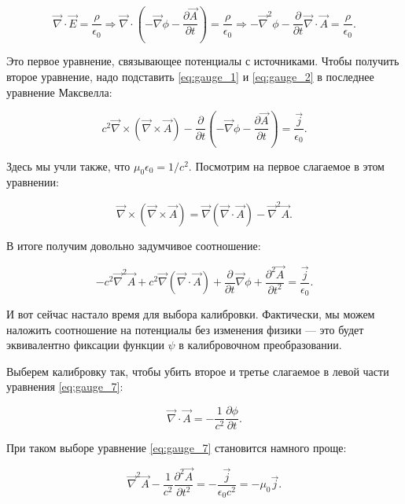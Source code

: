 \documentclass[12pt,a4paper]{article}
\numberwithin{equation}{section}
\numberwithin{equation}{section}
\newcommand{\pt}{\partial}
\newcommand{\vn}{\vec{\nabla}}
\newcommand{\eps}{\epsilon}
\begin{document}
\begin{equation}
  \label{eq:gauge_4}
  \vn \cdot \vec{E} = \frac{\rho}{\eps_0} \Rightarrow \vn \cdot \left(
   -\vn \phi - \frac{\pt \vec{A}}{\pt t} \right) =
 \frac{\rho}{\eps_0} \Rightarrow -\vn^2 \phi - \frac{\pt}{\pt t} \vn
 \cdot \vec{A} = \frac{\rho}{\eps_0}.
\end{equation}

Это первое уравнение, связывающее потенциалы с источниками. Чтобы
получить второе уравнение, надо подставить \eqref{eq:gauge_1} и
\eqref{eq:gauge_2} в последнее уравнение Максвелла:

\begin{equation}
  \label{eq:gauge_5}
  c^2 \vn \times (\vn \times \vec{A}) - \frac{\pt}{\pt t} \left(
  -\vn \phi - \frac{\pt \vec{A}}{\pt t}\right) = \frac{\vec{j}}{\eps_0}.
\end{equation}

Здесь мы учли также, что $\mu_0 \eps_0 =1 /c^2$. Посмотрим на первое
слагаемое в этом уравнении:

\begin{equation}
  \label{eq:gauge_6}
  \vn \times (\vn \times \vec{A}) = \vn (\vn \cdot \vec{A}) - \vn^2 \vec{A}.
\end{equation}

В итоге получим довольно задумчивое соотношение: 

\begin{equation}
  \label{eq:gauge_7}
  -c^2 \vn^2 \vec{A} + c^2 \vn (\vn \cdot \vec{A}) + \frac{\pt}{\pt t}
  \vn \phi + \frac{\pt^2 \vec{A}}{\pt t^2} = \frac{\vec{j}}{\eps_0}.
\end{equation}

И вот сейчас настало время для выбора калибровки. Фактически, мы можем
наложить соотношение на потенциалы без изменения физики --- это будет
эквивалентно фиксации функции $\psi$ в калибровочном преобразовании. 

Выберем калибровку так, чтобы убить второе и третье слагаемое в левой
части уравнения \eqref{eq:gauge_7}:

\begin{equation}
  \label{eq:gauge_fix}
  \vn \cdot \vec{A} = -\frac{1}{c^2} \frac{\pt \phi}{\pt t}.
\end{equation}

При таком выборе уравнение \eqref{eq:gauge_7} становится намного
проще: 

\begin{equation}
  \label{eq:wave_A}
  \vn^2 \vec{A} - \frac{1}{c^2} \frac{\pt^2 \vec{A}}{\pt t^2} = -
  \frac{\vec{j}}{\eps_0 c^2} = -\mu_0 \vec{j}.
\end{equation}
\end{document}
